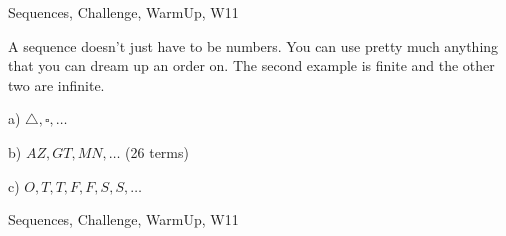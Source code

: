 \begin{tagblock}{Sequences, Challenge, WarmUp, W11}
\begin{question}

A sequence doesn't just have to be numbers. You can use pretty much anything that you can dream up an order on. The second example is finite and the other two are infinite. 

\bigskip

a) $\triangle,\square,\dots$

\bigskip

b) $AZ,GT,MN,\dots$ (26 terms)

\bigskip

c) $O,T,T,F,F,S,S,\dots$

	
	
\begin{tags}
	    Sequences, Challenge, WarmUp, W11
\end{tags}
	
\begin{diary}
	   
\end{diary}
	
\begin{solution}	

\end{solution}
	
\end{question}

\end{tagblock}





